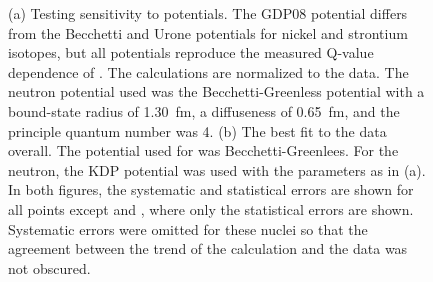 \begin{figure}[!htbp]
\centering
{}
\caption{(a) Testing sensitivity to  potentials.  The GDP08 potential differs from the Becchetti and Urone potentials for nickel and strontium isotopes, but all potentials reproduce the measured Q-value dependence of \GeTargets.  The calculations are normalized to the  data.  The neutron potential used was the Becchetti-Greenless potential with a bound-state radius of 1.30~fm, a diffuseness of 0.65~fm, and the principle quantum number was 4.  (b) The best fit to the data overall.  The potential used for  was Becchetti-Greenlees.  For the neutron, the KDP potential was used with the parameters as in (a).  In both figures, the systematic and statistical errors are shown for all points except  and , where only the statistical errors are shown.  Systematic errors were omitted for these nuclei so that the agreement between the trend of the calculation and the data was not obscured.}
\label{fig:parameterSensitivity}
\end{figure}


